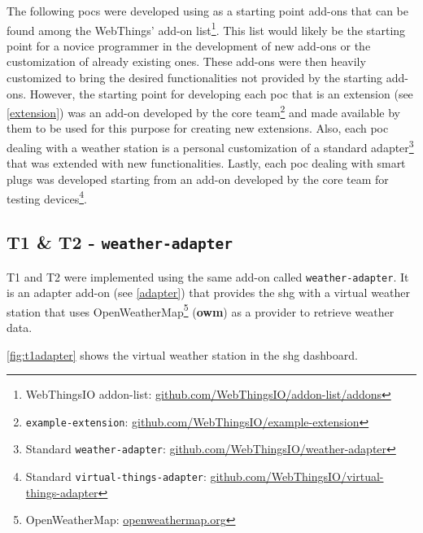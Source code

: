 The following \glspl{poc} were developed using as a starting point add-ons that can be found among the WebThings' add-on list\footnote{WebThingsIO addon-list: \href{https://github.com/WebThingsIO/addon-list/tree/master/addons}{github.com/WebThingsIO/addon-list/addons}}. 
This list would likely be the starting point for a novice programmer in the development of new add-ons or the customization of already existing ones.  These add-ons were then heavily customized to bring the desired functionalities not provided by the starting add-ons.
However, the starting point for developing each \gls{poc} that is an extension (see \autoref{extension}) was an add-on developed by the core team\footnote{\texttt{example-extension}: \href{https://github.com/WebThingsIO/example-extension}{github.com/WebThingsIO/example-extension}} and made available by them to be used for this purpose for creating new extensions. Also, each \gls{poc} dealing with a weather station is a personal customization of a standard adapter\footnote{Standard \texttt{weather-adapter}: \href{https://github.com/WebThingsIO/weather-adapter}{github.com/WebThingsIO/weather-adapter}} that was extended with new functionalities. Lastly, each \gls{poc} dealing with smart plugs was developed starting from an add-on developed by the core team for testing devices\footnote{Standard \texttt{virtual-things-adapter}: \href{https://github.com/WebThingsIO/virtual-things-adapter/}{github.com/WebThingsIO/virtual-things-adapter}}.


\subsection{T1 \& T2 - \texttt{weather-adapter}}
\label{t1t2pocsintro}

T1 and T2 were implemented using the same add-on called \texttt{weather-adapter}.  It is an adapter add-on (see \autoref{adapter}) that provides the \gls{shg} with a virtual weather station that uses OpenWeatherMap\footnote{OpenWeatherMap: \href{https://www.openweathermap.org}{openweathermap.org}} (\textbf{\gls{owm}}) as a provider to retrieve weather data.

\autoref{fig:t1adapter} shows the virtual weather station in the \gls{shg} dashboard.

